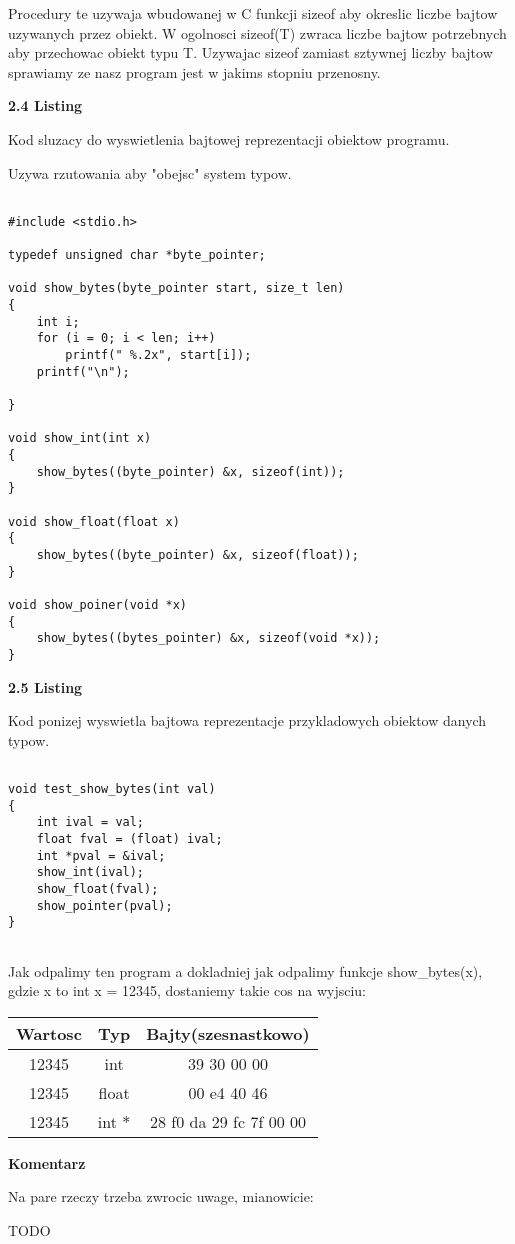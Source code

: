 \documentclass{article}
\begin{document}
Procedury te uzywaja wbudowanej w C funkcji sizeof aby okreslic liczbe bajtow uzywanych przez obiekt. W ogolnosci sizeof(T) zwraca liczbe bajtow potrzebnych aby przechowac obiekt typu T. Uzywajac sizeof zamiast sztywnej liczby bajtow sprawiamy ze nasz program jest w jakims stopniu przenosny.



\textbf{2.4 Listing}

Kod sluzacy do wyswietlenia bajtowej reprezentacji obiektow programu. 

Uzywa rzutowania aby "obejsc" system typow.

\begin{lstlisting}

#include <stdio.h>

typedef unsigned char *byte_pointer;

void show_bytes(byte_pointer start, size_t len)
{
    int i;
    for (i = 0; i < len; i++)
        printf(" %.2x", start[i]);
    printf("\n");

}

void show_int(int x)
{
    show_bytes((byte_pointer) &x, sizeof(int));
}

void show_float(float x)
{
    show_bytes((byte_pointer) &x, sizeof(float));
}

void show_poiner(void *x)
{
    show_bytes((bytes_pointer) &x, sizeof(void *x));
}

\end{lstlisting}

\textbf{2.5 Listing}

Kod ponizej wyswietla bajtowa reprezentacje przykladowych obiektow danych typow.

\begin{lstlisting}

void test_show_bytes(int val)
{
    int ival = val;
    float fval = (float) ival;
    int *pval = &ival;
    show_int(ival);
    show_float(fval);
    show_pointer(pval);
}
    
\end{lstlisting}


Jak odpalimy ten program a dokladniej jak odpalimy funkcje show\_bytes(x), gdzie x to int x = 12345, dostaniemy takie cos na wyjsciu:

\begin{tabular}{|c|c|c|}
    \hline
    Wartosc & Typ & Bajty(szesnastkowo)  \\
    \hline
    12345 & int & 39 30 00 00 \\
    \hline
    12345 & float & 00 e4 40 46 \\
    \hline 
    12345 & int $*$  & 28 f0 da 29 fc 7f 00 00 \\ 
    \hline
    
\end{tabular}

\textbf{Komentarz}

Na pare rzeczy trzeba zwrocic uwage, mianowicie:

TODO
\end{document}

